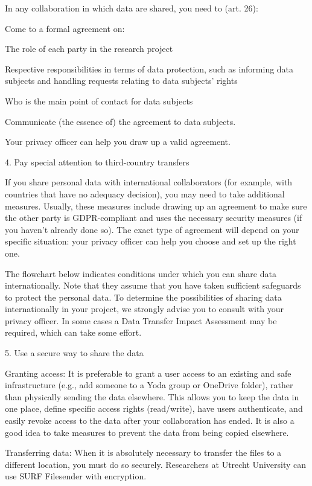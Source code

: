 \documentclass[
]{book}
\begin{document}
In any collaboration in which data are shared, you need to (art. 26):

Come to a formal agreement on:

The role of each party in the research project

Respective responsibilities in terms of data protection, such as informing data subjects and handling requests relating to data subjects' rights

Who is the main point of contact for data subjects

Communicate (the essence of) the agreement to data subjects.

Your privacy officer
can help you draw up a valid agreement.

4. Pay special attention to third-country transfers

If you share personal data with international collaborators (for example,
with countries that have no
adequacy decision),
you may need to take additional measures. Usually, these measures include
drawing up an agreement to make sure the other party is GDPR-compliant and
uses the necessary security measures (if you haven't already done so). The
exact type of agreement will depend on your specific situation: your
privacy officer
can help you choose and set up the right one.

The flowchart below indicates conditions under which you can share data
internationally. Note that they assume that you have taken sufficient
safeguards to protect the personal data. To determine the possibilities
of sharing data internationally in your project, we strongly advise you
to consult with your privacy officer. In some cases a Data Transfer Impact Assessment may
be required, which can take some effort.

5. Use a secure way to share the data

Granting access: It is preferable to grant a user access
to an existing and safe infrastructure (e.g., add someone to a Yoda
group or OneDrive folder), rather than physically sending the data
elsewhere. This allows you to keep the data in one place, define
specific access rights (read/write), have users authenticate, and
easily revoke access to the data after your collaboration has ended.
It is also a good idea to take measures to prevent the data from
being copied elsewhere.

Transferring data: When it is absolutely necessary to
transfer the files to a different location, you must do so securely.
Researchers at Utrecht University can use
SURF Filesender
with encryption.
\end{document}

